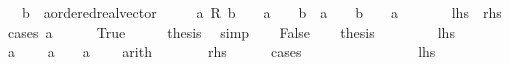 \begin{isabellebody}
\ \ \ b\ {\isacharcolon}{\kern0pt}{\isacharcolon}{\kern0pt}\ {\isachardoublequoteopen}{\isacharprime}{\kern0pt}a{\isacharcolon}{\kern0pt}{\isacharcolon}{\kern0pt}ordered{\isacharunderscore}{\kern0pt}real{\isacharunderscore}{\kern0pt}vector{\isachardoublequoteclose}\isanewline
\ \ \ {\isachardoublequoteopen}{}\ {\isasymle}\ a\ {\isacharasterisk}{\kern0pt}\isactrlsub R\ b\ {\isasymlongleftrightarrow}\ {}\ {\isacharless}{\kern0pt}\ a\ {\isasymand}\ {}\ {\isasymle}\ b\ {\isasymor}\ a\ {\isacharless}{\kern0pt}\ {}\ {\isasymand}\ b\ {\isasymle}\ {}\ {\isasymor}\ a\ {\isacharequal}{\kern0pt}\ {}{\isachardoublequoteclose}\isanewline
\ \ \ \ {\isacharparenleft}{\kern0pt}\ {\isachardoublequoteopen}{\isacharquery}{\kern0pt}lhs\ {\isacharequal}{\kern0pt}\ {\isacharquery}{\kern0pt}rhs{\isachardoublequoteclose}{\isacharparenright}{\kern0pt}\isanewline
%
\isadelimproof
%
\endisadelimproof
%
\isatagproof
{}\isamarkupfalse%
\ {\isacharparenleft}{\kern0pt}cases\ {\isachardoublequoteopen}a\ {\isacharequal}{\kern0pt}\ {}{\isachardoublequoteclose}{\isacharparenright}{\kern0pt}\isanewline
\ \ \isamarkupfalse%
\ True\isanewline
\ \ \isamarkupfalse%
\ \isamarkupfalse%
\ {\isacharquery}{\kern0pt}thesis\ \isamarkupfalse%
\ simp\isanewline
{}\isamarkupfalse%
\isanewline
\ \ \isamarkupfalse%
\ False\isanewline
\ \ \isamarkupfalse%
\ {\isacharquery}{\kern0pt}thesis\isanewline
\ \ \isamarkupfalse%
\isanewline
\ \ \ \ \isamarkupfalse%
\ {\isacharquery}{\kern0pt}lhs\isanewline
\ \ \ \ \isamarkupfalse%
\ {\isacartoucheopen}a\ {\isasymnoteq}\ {}{\isacartoucheclose}\ \isamarkupfalse%
\ {\isachardoublequoteopen}a\ {\isachargreater}{\kern0pt}\ {}{\isachardoublequoteclose}\ {\isacharbar}{\kern0pt}\ {\isachardoublequoteopen}a\ {\isacharless}{\kern0pt}\ {}{\isachardoublequoteclose}\ \isamarkupfalse%
\ arith\isanewline
\ \ \ \ \isamarkupfalse%
\ \isamarkupfalse%
\ {\isacharquery}{\kern0pt}rhs\isanewline
\ \ \ \ \isamarkupfalse%
\ cases\isanewline
\ \ \ \ \ \ \isamarkupfalse%
\ {}\isanewline
\ \ \ \ \ \ \isamarkupfalse%
\ {\isacartoucheopen}{\isacharquery}{\kern0pt}lhs{\isacartoucheclose}\ \isamarkupfalse%

\end{isabellebody}
